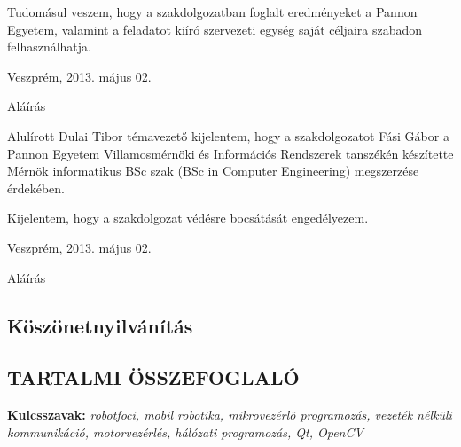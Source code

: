 \documentclass[a4paper,12pt,oneside]{report}
\begin{document}
Tudomásul veszem, hogy a szakdolgozatban foglalt eredményeket a Pannon Egyetem, valamint a feladatot kiíró szervezeti egység saját céljaira szabadon felhasználhatja.\\

\begin{flushleft}
{Veszprém, 2013. május 02.\\}
\end{flushleft}

\begin{flushright}
{Aláírás \vspace{4cm}}
\end{flushright}

Alulírott Dulai Tibor témavezető kijelentem, hogy a szakdolgozatot Fási Gábor a Pannon Egyetem Villamosmérnöki és Információs Rendszerek tanszékén készítette Mérnök informatikus BSc szak (BSc in Computer Engineering) megszerzése érdekében.

Kijelentem, hogy a szakdolgozat védésre bocsátását engedélyezem.\\

\begin{flushleft}
{Veszprém, 2013. május 02.\\}
\end{flushleft}

\begin{flushright}
{Aláírás}
\end{flushright}
\newpage
\pagebreak
\begin{center}
\section*{Köszönetnyilvánítás}
\end{center}
\newpage

\begin{center}
\section*{\textbf{\Large \MakeUppercase{Tartalmi összefoglaló}}}
\end{center}


\vspace{2cm}

{\bf Kulcsszavak:} {\it robotfoci, mobil robotika, mikrovezérlõ
programozás, vezeték nélküli kommunikáció, motorvezérlés, hálózati
programozás, Qt, OpenCV }
\newpage
\end{document}
